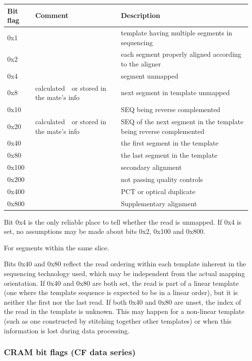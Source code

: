 \documentclass[a4paper]{article}
\begin{document}
\begin{threeparttable}[t]
\begin{tabular}{|>{\raggedright}p{144pt}|>{\raggedright}p{144pt}|>{\raggedright}p{144pt}|}
\hline
\textbf{Bit flag} & \textbf{Comment} & \textbf{Description}\tabularnewline
\hline
0x1 &  & template having multiple segments in sequencing\tabularnewline
\hline
0x2 &  & each segment properly aligned according to the aligner\tabularnewline
\hline
0x4 &  & segment unmapped\tnote{a}\tabularnewline
\hline
0x8 & calculated\tnote{b}\ \ or stored in the mate's info & next segment in template unmapped\tabularnewline
\hline
0x10 &  & SEQ being reverse complemented\tabularnewline
\hline
0x20 & calculated\tnote{b}\ \ or stored in the mate's info & SEQ of the next segment in the
template being reverse complemented\tabularnewline
\hline
0x40 &  & the first segment in the template\tnote{c}\tabularnewline
\hline
0x80 &  & the last segment in the template\tnote{c}\tabularnewline
\hline
0x100 &  & secondary alignment\tabularnewline
\hline
0x200 &  & not passing quality controls\tabularnewline
\hline
0x400 &  & PCT or optical duplicate\tabularnewline
\hline
0x800 &  & Supplementary alignment\tabularnewline
\hline
\end{tabular}
\begin{tablenotes}
\item[a] Bit 0x4 is the only reliable place to tell whether the read is unmapped.  If 0x4 is set, no assumptions may be made about bits 0x2, 0x100 and 0x800.
\item[b] For segments within the same slice.
\item[c] Bits 0x40 and 0x80 reflect the read ordering within each template inherent in the sequencing technology used, which may be independent from the actual mapping orientation.
If 0x40 and 0x80 are both set, the read is part of a linear template (one where the template sequence is expected to be in a linear order), but it is neither the first nor the last read.
If both 0x40 and 0x80 are unset, the index of the read in the template is unknown.
This may happen for a non-linear template (such as one constructed by stitching together other templates) or when this information is lost during data processing.
\end{tablenotes}
\end{threeparttable}

\subsubsection*{\textbf{CRAM bit flags (CF data series)}}
\end{document}
